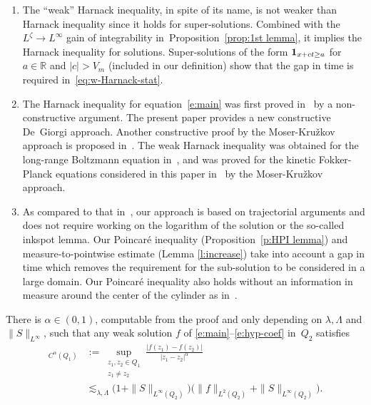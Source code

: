 \skpt
\begin{remarks}
\begin{enumerate}
\item The ``weak'' Harnack inequality, in spite of its name, is
not weaker than Harnack inequality since it holds for
super-solutions. Combined with the $L^{\zeta} \to L^\infty$
gain of integrability in~Proposition~\ref{prop:1st lemma}, it
implies the Harnack inequality for solutions. Super-solutions
of the form ${\bf 1}_{x+ct\ge a}$ for $a\in \mathbb{R}$ and
$|c|>V_m$ (included in our definition) show that the gap in
time is required in~\eqref{eq:w-Harnack-stat}.
\item The Harnack inequality for equation~\eqref{e:main} was
first proved in~\cite{gimv} by a non-constructive argument. The
present paper provides a new constructive De~Giorgi
approach. Another constructive proof by the Moser-Kru\v{z}kov
approach is proposed in~\cite{Guerand-Imbert}. The weak Harnack
inequality was obtained for the long-range Boltzmann equation
in~\cite{MR4049224}, and was proved for the kinetic
Fokker-Planck equations considered in this paper
in~\cite{Guerand-Imbert} by the Moser-Kru\v{z}kov approach.
\item As compared to that in~\cite{Guerand-Imbert}, our approach
is based on trajectorial arguments and does not require working
on the logarithm of the solution or the so-called inkspot
lemma. Our Poincaré inequality (Proposition~\ref{p:HPI
lemma}) and measure-to-pointwise estimate (Lemma
\ref{l:increase}) take into account a gap in time which removes
the requirement for the sub-solution to be considered in a
large domain. Our Poincaré inequality also holds without an
information in measure around the center of the cylinder as
in~\cite{Guerand-Imbert}.
\end{enumerate}
\end{remarks}

\begin{theorem}
\label{t:holder}
There is $\alpha \in (0,1)$, computable from the proof and only
depending on $\lambda, \Lambda$ and $\|S\|_{L^{\infty}}$, such
that any weak solution $f$ of \eqref{e:main}--\eqref{e:hyp-coef}
in~$Q_2$ satisfies\vspace*{-3pt}
\begin{align*}
[f]_{C^\alpha (Q_{1})}
& := \sup_{\substack{z_1,z_2 \in Q_1\\ z_1 \not =
z_2}} \frac{|f(z_1) - f(z_2)|}{|z_1-z_2|^{\alpha}} \\
& \lesssim_{\lambda,\Lambda}
\bigl(1+\|S\|_{L^\infty(Q_2)} \bigr)
\bigl( \|f\|_{L^2 (Q_2)} + \|S\|_{L^\infty(Q_2)} \bigr).
\end{align*}
\end{theorem}

